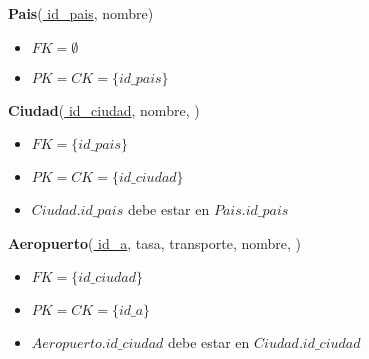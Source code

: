 
\vspace*{0.1cm}
\noindent
\textbf{Pais}(\underline{
	id\_pais}, 
	nombre)

\begin{itemize}[noitemsep]
	\item $FK = \emptyset$
	\item $PK = CK = \{id\_pais\}$
\end{itemize}


\noindent
\textbf{Ciudad}(\underline{
	id\_ciudad}, 
	nombre, )
\begin{itemize}[noitemsep]
	\item $FK = \{id\_pais\}$
	\item $PK = CK = \{id\_ciudad\}$
	\item $Ciudad.id\_pais$ debe estar en $Pais.id\_pais$
\end{itemize}


\vspace*{0.1cm}
\noindent
\textbf{Aeropuerto}(\underline{
	id\_a}, 
	tasa, 
	transporte, 
	nombre, )

\begin{itemize}[noitemsep]
	\item $FK = \{id\_ciudad\}$
	\item $PK = CK = \{id\_a\}$
	\item $Aeropuerto.id\_ciudad$ debe estar en $Ciudad.id\_ciudad$
\end{itemize}
